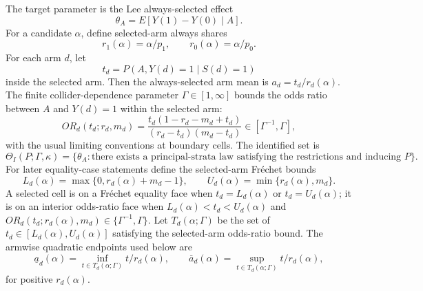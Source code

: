 \documentclass[11pt]{article}
\theoremstyle{definition}
\theoremstyle{plain}
\theoremstyle{remark}
\begin{document}
The target parameter is the Lee always-selected effect
\[
  \theta_A = E[Y(1)-Y(0)\mid A].
\]
For a candidate \(\alpha\), define selected-arm always shares
\[
  r_1(\alpha)=\alpha/p_1,\qquad r_0(\alpha)=\alpha/p_0.
\]
For each arm \(d\), let
\[
  t_d=P(A,Y(d)=1\mid S(d)=1)
\]
inside the selected arm.  Then the always-selected arm mean is \(a_d=t_d/r_d(\alpha)\).  The finite collider-dependence parameter \(\Gamma\in[1,\infty]\) bounds the odds ratio between \(A\) and \(Y(d)=1\) within the selected arm:
\[
  OR_d(t_d;r_d,m_d)
  =
  \frac{t_d(1-r_d-m_d+t_d)}{(r_d-t_d)(m_d-t_d)}
  \in[\Gamma^{-1},\Gamma],
\]
with the usual limiting conventions at boundary cells.  The identified set is
\[
  \Theta_I(P;\Gamma,\kappa)
  =
  \{\theta_A:\text{there exists a principal-strata law satisfying the restrictions and inducing }P\}.
\]
For later equality-case statements define the selected-arm Fréchet bounds
\[
  L_d(\alpha)=\max\{0,r_d(\alpha)+m_d-1\},\qquad
  U_d(\alpha)=\min\{r_d(\alpha),m_d\}.
\]
A selected cell is on a Fréchet equality face when \(t_d=L_d(\alpha)\) or \(t_d=U_d(\alpha)\); it is on an interior odds-ratio face when \(L_d(\alpha)<t_d<U_d(\alpha)\) and \(OR_d(t_d;r_d(\alpha),m_d)\in\{\Gamma^{-1},\Gamma\}\).
Let \(T_d(\alpha;\Gamma)\) be the set of \(t_d\in[L_d(\alpha),U_d(\alpha)]\) satisfying the selected-arm odds-ratio bound.  The armwise quadratic endpoints used below are
\[
  \underline a_d(\alpha)=\inf_{t\in T_d(\alpha;\Gamma)} t/r_d(\alpha),
  \qquad
  \overline a_d(\alpha)=\sup_{t\in T_d(\alpha;\Gamma)} t/r_d(\alpha),
\]
for positive \(r_d(\alpha)\).
\end{document}
